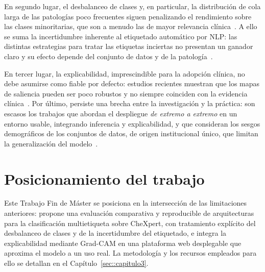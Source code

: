 En segundo lugar, el desbalanceo de clases y, en particular, la distribución de
cola larga de las patologías poco frecuentes siguen penalizando el rendimiento
sobre las clases minoritarias, que son a menudo las de mayor relevancia
clínica~\cite{lizDeepLearningMultilabel2023, holsteCXRLT2024}. A ello se suma la
incertidumbre inherente al etiquetado automático por NLP: las distintas
estrategias para tratar las etiquetas inciertas no presentan un ganador claro y
su efecto depende del conjunto de datos y de la
patología~\cite{irvinCheXpertLargeChest2019, phamInterpretingChestXrays2021}.

En tercer lugar, la explicabilidad, imprescindible para la adopción clínica,
no debe asumirse como fiable por defecto: estudios recientes muestran que los
mapas de saliencia pueden ser poco robustos y no siempre coinciden con la
evidencia clínica~\cite{zhangRevisitingTrustworthiness2024}. Por último, persiste
una brecha entre la investigación y la práctica: son escasos los trabajos que
abordan el despliegue \textit{de extremo a extremo} en un entorno usable,
integrando inferencia y explicabilidad, y que consideran los sesgos demográficos
de los conjuntos de datos, de origen institucional único, que limitan la
generalización del modelo~\cite{korfiatisImplementingArtificial2025,
bustosPadChest2020}.


\section{Posicionamiento del trabajo}
\label{sec::ec_sintesis}

Este Trabajo Fin de Máster se posiciona en la intersección de las limitaciones
anteriores: propone una evaluación comparativa y reproducible de arquitecturas
para la clasificación multietiqueta sobre CheXpert, con tratamiento explícito del
desbalanceo de clases y de la incertidumbre del etiquetado, e integra la
explicabilidad mediante Grad-CAM en una plataforma web desplegable que aproxima
el modelo a un uso real. La metodología y los recursos empleados para ello se
detallan en el Capítulo~\ref{sec::capitulo3}.
